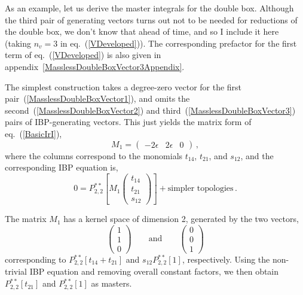 \documentclass[aps,prd,preprint,groupedaddress,nofootinbib,showpacs,eqsecnum]{revtex4}
\def\eqn#1{eq.~(\ref{#1})}
\def\eps{\epsilon}
\def\Pss#1#2{P^{**}_{#1,#2}}
\begin{document}
As an example, let us derive the master integrals for the double box.
Although the third pair of generating vectors turns out not
to be needed for reductions of the double box, we don't know that ahead
of time, and so I include it here (taking $n_v=3$ in \eqn{VDeveloped}).  
The corresponding prefactor for the first term of \eqn{VDeveloped} is also given
in appendix~\ref{MasslessDoubleBoxVector3Appendix}.

The simplest construction takes a degree-zero vector for the first
pair~(\ref{MasslessDoubleBoxVector1}), 
and omits the second~(\ref{MasslessDoubleBoxVector2}) and
third~(\ref{MasslessDoubleBoxVector3}) pairs of IBP-generating
vectors.  This just yields the matrix form of \eqn{BasicIrI},
\begin{equation}
M_1 = 
  \left(\begin{matrix} 
     -2\eps& 2\eps& 0 
  \end{matrix}\right)\,,
\label{MasterMatrix1}
\end{equation}
where the columns correspond to the monomials $t_{14}$, $t_{21}$, and
$s_{12}$, and the corresponding IBP equation is,
\begin{equation}
0 = \Pss22[M_1 
\left(\begin{matrix} t_{14}\\ t_{21}\\ s_{12}\end{matrix}\right)
]+\textrm{simpler\ topologies}\,.
\end{equation}

The matrix $M_1$ has a kernel space of dimension 2, generated by the two
vectors,
\begin{equation}
\left(\begin{matrix} 1\\1\\0\end{matrix}\right)\qquad\textrm{and}\qquad
\left(\begin{matrix} 0\\0\\1\end{matrix}\right)
\end{equation}
corresponding to $\Pss22[t_{14}+t_{21}]$ and $s_{12} \Pss22[1]$, respectively.
Using the non-trivial IBP equation and removing overall constant factors,
we then obtain $\Pss22[t_{21}]$ and $\Pss22[1]$ as masters.
\end{document}
